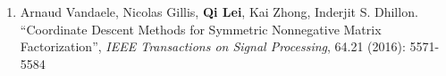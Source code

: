 \documentclass[margin, 10pt]{res} %
\begin{document}
\begin{resume}
\begin{enumerate}
	\item {Arnaud Vandaele, Nicolas Gillis, \textbf{Qi Lei},
      Kai Zhong, Inderjit S. Dhillon. ``Coordinate Descent Methods for
		Symmetric Nonnegative Matrix Factorization'', \textit{IEEE Transactions on 
Signal Processing}, 64.21 (2016): 5571-5584}	
\end{enumerate}

\begin{comment}
\section{SOFTWARE}
 \textit{Github: }\url{https://github.com/cecilialeiqi/}\\
 {\sl SPIRAL} \hfill May 2016 - July 2017
 \begin{itemize}
   \item Feature representation learning of any time series data
    \end{itemize}
 {\sl DDI} \hfill Jan 2017 - May 2017
 \begin{itemize}
   \item Use an inductive tensor completion based methods to predict drug-drug interactions
   \end{itemize}
   {\sl NUTF} \hfill August 2016 - February 2017
   \begin{itemize}
     \item Negative-Unlabeled Tensor Factorization for Location\ Context 
       Inference from Inaccurate Mobility Data
      \end{itemize}
 \end{itemize} 
\end{comment}


\end{resume}
\end{document}
